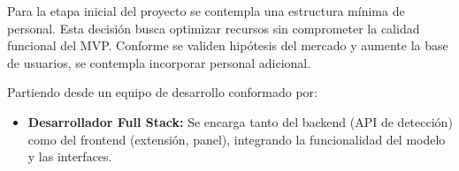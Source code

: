 Para la etapa inicial del proyecto se contempla una estructura mínima de personal. Esta decisión busca optimizar recursos sin comprometer la calidad funcional del MVP. Conforme se validen hipótesis del mercado y aumente la base de usuarios, se contempla incorporar personal adicional.

Partiendo desde un equipo de desarrollo conformado por:

\begin{itemize}
    \item \textbf{Desarrollador Full Stack:} Se encarga tanto del backend (API de detección) como del frontend (extensión, panel), integrando la funcionalidad del modelo y las interfaces.
\end{itemize}
